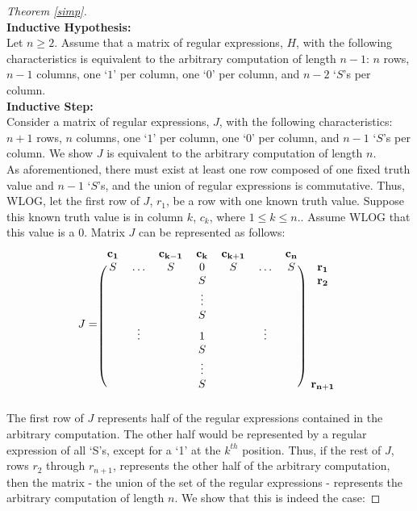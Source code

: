 \documentclass[runningheads]{llncs}
\begin{document}
\begin{proof}[Theorem \ref{simp}]
$$        $$
\noindent \textbf{Inductive Hypothesis:}\\
Let $n\geq 2$. Assume that a matrix of regular expressions, $H$, with the following characteristics is equivalent to the arbitrary computation of length $n-1$: $n$ rows, $n-1$ columns, one `$1$' per column, one `$0$' per column, and $n-2$ `$S$'s per column.\\
\noindent \textbf{Inductive Step:}\\
Consider a matrix of regular expressions, $J$, with the following characteristics: $n+1$ rows, $n$ columns, one `$1$' per column, one `$0$' per column, and $n-1$ `$S$'s per column. We show $J$ is equivalent to the arbitrary computation of length $n$.\\
As aforementioned, there must exist at least one row composed of one fixed truth value and $n-1$ `$S$'s, and the union of regular expressions is commutative. Thus, WLOG, let the first row of $J$, $r_1$, be a row with one known truth value.
Suppose this known truth value is in column $k$, $c_k$, where $1 \leq k \leq n$.. Assume WLOG that this value is a 0. Matrix $J$ can be represented as follows:
\[
J = \begin{blockarray}{cccccccc}
\mathbf{c_1} & & \mathbf{c_{k-1}} & \mathbf{c_k} & \mathbf{c_{k+1}} & & \mathbf{c_n} \\
\begin{block}{(ccccccc)c}
    S & \hdots & S & 0 & S & \hdots & S & \mathbf{r_1}\\
     &  &  & S &  &  &  & \mathbf{r_2}\\
    &  &  & \vdots &  &  &  & \\
    &  & & S &  &  &  & \\
    & \vdots &  & 1 &  & \vdots &  & \\
    & &  & S &  & &  & \\
    &  &  & \vdots & &  &  & \\
    &  & & S & &  & & \mathbf{r_{n+1}}\\
\end{block}
\end{blockarray}
 \]
The first row of $J$ represents half of the regular expressions contained in the arbitrary computation. The other half would be represented by a regular expression of all `S's, except for a `1' at the $k^{th}$ position. Thus, if the rest of $J$, rows $r_2$ through $r_{n+1}$, represents the other half of the arbitrary computation, then the matrix - the union of the set of the regular expressions - represents the arbitrary computation of length $n$. We show that this is indeed the case:

\end{proof}
\end{document}
